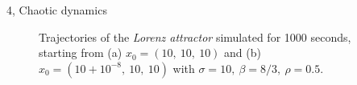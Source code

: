 \documentclass[10pt,a4paper]{article}
\begin{document}
\begin{task}{4, Chaotic dynamics}
\begin{figure}[H]
    \centering
    \hfill
    \caption{Trajectories of the \textit{Lorenz attractor} simulated for 1000 seconds, starting from (a) $x_0 = (10,\ 10,\ 10)$ and (b) $\hat{x}_0 = (10+10^{-8},\ 10,\ 10)$ with $\sigma = 10,\ \beta = 8/3,\ \rho = 0.5$.}
    \label{fig:lorenz-trajs-1000s-r0.5}
\end{figure}

\end{task}
\end{document}
